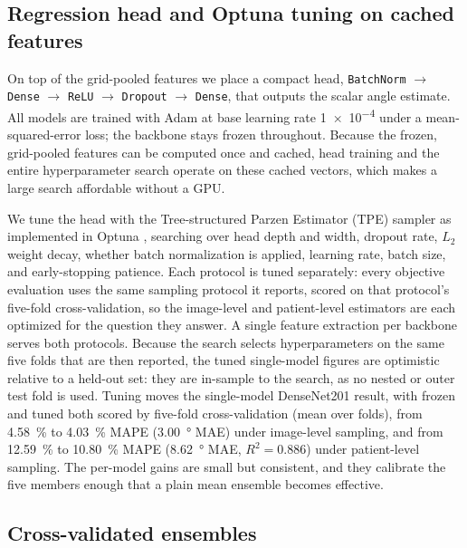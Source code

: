\subsection{Regression head and Optuna tuning on cached features}
\label{sec:methods:head}

On top of the grid-pooled features we place a compact head, \texttt{BatchNorm} $\rightarrow$ \texttt{Dense} $\rightarrow$ \texttt{ReLU} $\rightarrow$ \texttt{Dropout} $\rightarrow$ \texttt{Dense}, that outputs the scalar angle estimate. All models are trained with Adam \citep{Kingma2015} at base learning rate \num{1e-4} under a mean-squared-error loss; the backbone stays frozen throughout. Because the frozen, grid-pooled features can be computed once and cached, head training and the entire hyperparameter search operate on these cached vectors, which makes a large search affordable without a GPU.

We tune the head with the Tree-structured Parzen Estimator (TPE) sampler \citep{Bergstra2011} as implemented in Optuna \citep{Akiba2019}, searching over head depth and width, dropout rate, $L_2$ weight decay, whether batch normalization is applied, learning rate, batch size, and early-stopping patience. Each protocol is tuned separately: every objective evaluation uses the same sampling protocol it reports, scored on that protocol's five-fold cross-validation, so the image-level and patient-level estimators are each optimized for the question they answer. A single feature extraction per backbone serves both protocols. Because the search selects hyperparameters on the same five folds that are then reported, the tuned single-model figures are optimistic relative to a held-out set: they are in-sample to the search, as no nested or outer test fold is used. Tuning moves the single-model DenseNet201 result, with frozen and tuned both scored by five-fold cross-validation (mean over folds), from \SI{4.58}{\percent} to \SI{4.03}{\percent} MAPE (\SI{3.00}{\degree} MAE) under image-level sampling, and from \SI{12.59}{\percent} to \SI{10.80}{\percent} MAPE (\SI{8.62}{\degree} MAE, $R^2=0.886$) under patient-level sampling. The per-model gains are small but consistent, and they calibrate the five members enough that a plain mean ensemble becomes effective.

\subsection{Cross-validated ensembles}
\label{sec:methods:ensemble}

